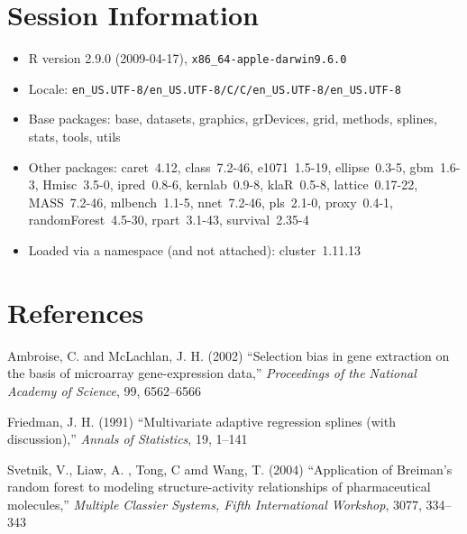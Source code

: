 \documentclass[12pt]{article}
\begin{document}
\section{Session Information}

\begin{itemize}
  \item R version 2.9.0 (2009-04-17), \verb|x86_64-apple-darwin9.6.0|
  \item Locale: \verb|en_US.UTF-8/en_US.UTF-8/C/C/en_US.UTF-8/en_US.UTF-8|
  \item Base packages: base, datasets, graphics, grDevices, grid,
    methods, splines, stats, tools, utils
  \item Other packages: caret~4.12, class~7.2-46, e1071~1.5-19,
    ellipse~0.3-5, gbm~1.6-3, Hmisc~3.5-0, ipred~0.8-6, kernlab~0.9-8,
    klaR~0.5-8, lattice~0.17-22, MASS~7.2-46, mlbench~1.1-5,
    nnet~7.2-46, pls~2.1-0, proxy~0.4-1, randomForest~4.5-30,
    rpart~3.1-43, survival~2.35-4
  \item Loaded via a namespace (and not attached): cluster~1.11.13
\end{itemize}
\section{References}

\begin{description}    
  \item Ambroise, C. and McLachlan, J. H. (2002) ``Selection bias in gene extraction on the basis of microarray gene-expression data,'' {\it Proceedings of the National Academy of Science}, 99, 6562--6566
  
  \item Friedman, J. H. (1991) ``Multivariate adaptive regression splines (with discussion),'' {\it Annals of Statistics}, 19, 1--141
  \item  Svetnik, V., Liaw, A. , Tong, C amd Wang, T. (2004) ``Application of Breiman's random forest to modeling structure-activity relationships of pharmaceutical molecules,'' {\it Multiple Classier Systems, Fifth International Workshop}, 3077, 334--343
  \end{description}
\end{document}
